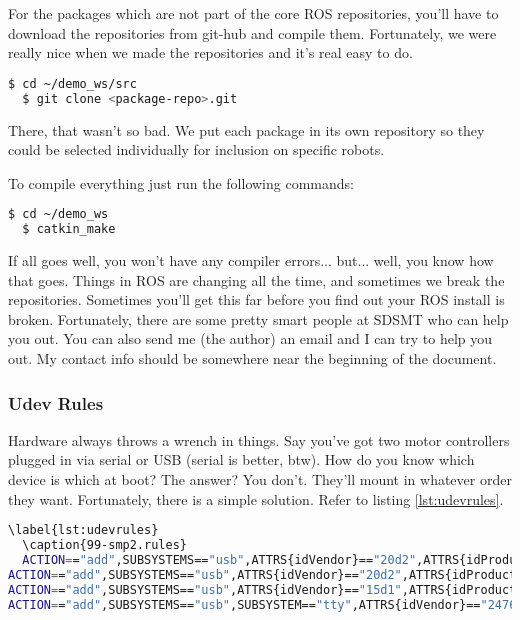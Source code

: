 For the packages which are not part of the core ROS repositories, you'll have to download the repositories from git-hub and compile them. Fortunately, we were really nice when we made the repositories and it's real easy to do.

\begin{lstlisting}[language=bash]
  $ cd ~/demo_ws/src
  $ git clone <package-repo>.git
\end{lstlisting}

There, that wasn't so bad. We put each package in its own repository so they could be selected individually for inclusion on specific robots.

To compile everything just run the following commands:

\begin{lstlisting}[language=bash]
  $ cd ~/demo_ws
  $ catkin_make
\end{lstlisting}

If all goes well, you won't have any compiler errors... but... well, you know how that goes. Things in ROS are changing all the time, and sometimes we break the repositories. Sometimes you'll get this far before you find out your ROS install is broken. Fortunately, there are some pretty smart people at SDSMT who can help you out. You can also send me (the author) an email and I can try to help you out. My contact info should be somewhere near the beginning of the document.

\subsubsection{Udev Rules}

Hardware always throws a wrench in things. Say you've got two motor controllers plugged in via serial or USB (serial is better, btw). How do you know which device is which at boot? The answer? You don't. They'll mount in whatever order they want. Fortunately, there is a simple solution. Refer to listing \ref{lst:udevrules}.

\begin{lstlisting}[language=bash]
  \label{lst:udevrules}
  \caption{99-smp2.rules}
  ACTION=="add",SUBSYSTEMS=="usb",ATTRS{idVendor}=="20d2",ATTRS{idProduct}=="5740",ATTRS{serial}=="498326853235",SYMLINK+="robot/left_motor_controller",MODE="0666"
ACTION=="add",SUBSYSTEMS=="usb",ATTRS{idVendor}=="20d2",ATTRS{idProduct}=="5740",ATTRS{serial}=="498626953235",SYMLINK+="robot/right_motor_controller",MODE="0666"
ACTION=="add",SUBSYSTEMS=="usb",ATTRS{idVendor}=="15d1",ATTRS{idProduct}=="0000",SYMLINK+="robot/lidar",MODE="0666"
ACTION=="add",SUBSYSTEMS=="usb",SUBSYSTEM=="tty",ATTRS{idVendor}=="2476",ATTRS{idProduct}=="1010",SYMLINK="robot/imu",MODE="0666"
\end{lstlisting}

